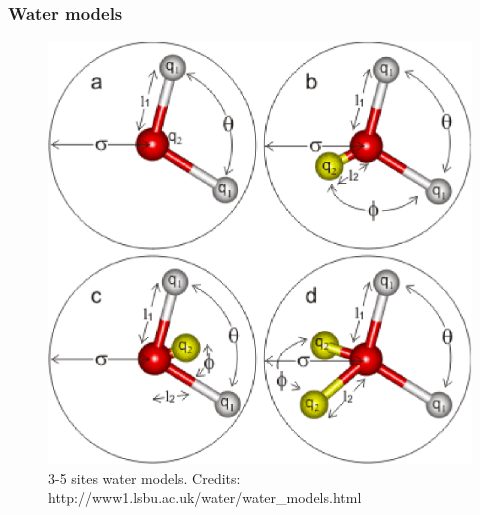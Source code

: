 \documentclass{beamer}
\begin{document}
\begin{frame}\frametitle{Water models}

\begin{figure}
\includegraphics[scale=0.34]{h2o_models.eps}
\caption{{\scriptsize 3-5 sites water models. Credits: http://www1.lsbu.ac.uk/water/water\_models.html}}
\end{figure}

\end{frame}


%
%
\end{document}
